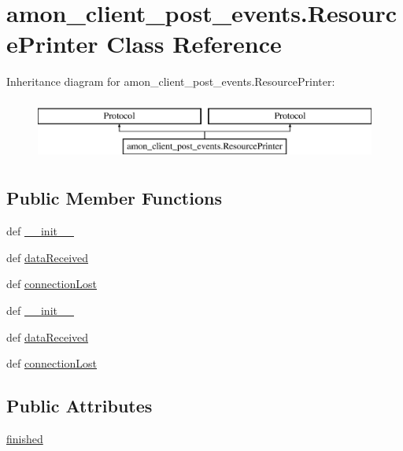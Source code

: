 \hypertarget{classamon__client__post__events_1_1_resource_printer}{\section{amon\-\_\-client\-\_\-post\-\_\-events.\-Resource\-Printer Class Reference}
\label{classamon__client__post__events_1_1_resource_printer}
}
Inheritance diagram for amon\-\_\-client\-\_\-post\-\_\-events.\-Resource\-Printer\-:\begin{figure}[H]
\begin{center}
\leavevmode
\includegraphics[height=2.000000cm]{classamon__client__post__events_1_1_resource_printer}
\end{center}
\end{figure}
\subsection*{Public Member Functions}
\begin{DoxyCompactItemize}
\item 
def \hyperlink{classamon__client__post__events_1_1_resource_printer_a545cf358c1e8ca262d0f1af51a056acd}{\-\_\-\-\_\-init\-\_\-\-\_\-}
\item 
def \hyperlink{classamon__client__post__events_1_1_resource_printer_ad6d5f4bc2e95b9e5e64060b75f67991e}{data\-Received}
\item 
def \hyperlink{classamon__client__post__events_1_1_resource_printer_a0f452c81698e230d9757c0529a1dd1c7}{connection\-Lost}
\item 
def \hyperlink{classamon__client__post__events_1_1_resource_printer_a545cf358c1e8ca262d0f1af51a056acd}{\-\_\-\-\_\-init\-\_\-\-\_\-}
\item 
def \hyperlink{classamon__client__post__events_1_1_resource_printer_ad6d5f4bc2e95b9e5e64060b75f67991e}{data\-Received}
\item 
def \hyperlink{classamon__client__post__events_1_1_resource_printer_a0f452c81698e230d9757c0529a1dd1c7}{connection\-Lost}
\end{DoxyCompactItemize}
\subsection*{Public Attributes}
\begin{DoxyCompactItemize}
\item 
\hyperlink{classamon__client__post__events_1_1_resource_printer_a3ce60f948a4daf648804159b510a78f8}{finished}
\end{DoxyCompactItemize}


